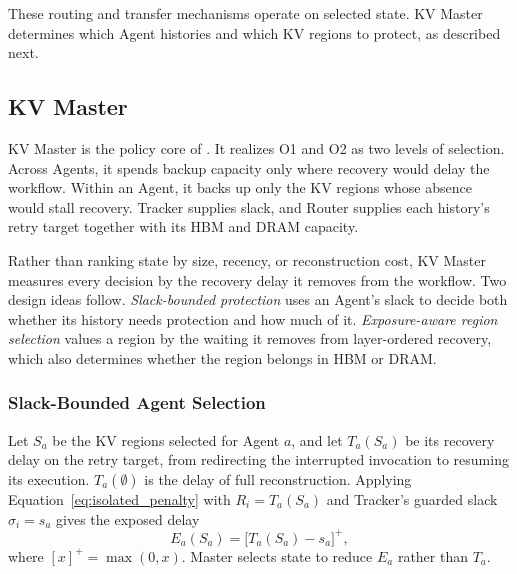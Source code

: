 These routing and transfer mechanisms operate on selected state.
KV Master determines which Agent histories and which KV regions to
protect, as described next.

\subsection{KV Master}
\label{sec:master}

KV Master is the policy core of \system. It realizes O1 and O2 as two
levels of selection. Across Agents, it spends backup capacity only where
recovery would delay the workflow. Within an Agent, it backs up only the
KV regions whose absence would stall recovery. Tracker supplies slack,
and Router supplies each history's retry target together with its HBM
and DRAM capacity.

Rather than ranking state by size, recency, or reconstruction cost, KV
Master measures every decision by the recovery delay it removes from the
workflow. Two design ideas follow. \emph{Slack-bounded protection} uses
an Agent's slack to decide both whether its history needs protection and
how much of it. \emph{Exposure-aware region selection} values a region by
the waiting it removes from layer-ordered recovery, which also
determines whether the region belongs in HBM or DRAM.

\subsubsection{Slack-Bounded Agent Selection}
\label{sec:agent-protection}

Let $S_a$ be the KV regions selected for Agent $a$, and let $T_a(S_a)$ be
its recovery delay on the retry target, from redirecting the interrupted
invocation to resuming its execution. $T_a(\emptyset)$ is the delay of
full reconstruction. Applying Equation~\ref{eq:isolated_penalty} with
$R_i=T_a(S_a)$ and Tracker's guarded slack $\sigma_i=s_a$ gives the
exposed delay
\begin{equation}
 E_a(S_a)=\bigl[T_a(S_a)-s_a\bigr]^+,
 \label{eq:exposed-delay}
\end{equation}
where $[x]^+=\max(0,x)$. Master selects state to reduce $E_a$ rather
than $T_a$.

